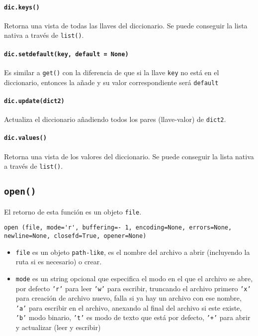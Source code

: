 \paragraph{\texttt{dic.keys()}} Retorna una vista de todas las llaves del
diccionario. Se puede conseguir la lista nativa a través de \texttt{list()}.

\paragraph{\texttt{dic.setdefault(key, default = None)}} Es similar a
\texttt{get()} con la diferencia de que si la llave \texttt{key} no está en el
diccionario, entonces la añade y su valor correspondiente será \texttt{default}

\paragraph{\texttt{dic.update(dict2)}} Actualiza el diccionario añadiendo todos
los pares (llave-valor) de \texttt{dict2}.

\paragraph{\texttt{dic.values()}} Retorna una vista de los valores del
diccionario. Se puede conseguir la lista nativa a través de \texttt{list()}.

\subsection{\texttt{open()}}

El retorno de esta función es un objeto \texttt{file}.

\begin{verbatim}
open (file, mode='r', buffering=- 1, encoding=None, errors=None, newline=None, closefd=True, opener=None)
\end{verbatim}

\begin{itemize}
    \item \texttt{file} es un objeto \texttt{path-like}, es el nombre del
          archivo a abrir (incluyendo la ruta si es necesario) o crear.
    \item \texttt{mode} es un string opcional que especifica el modo en el que
          el archivo se abre, por defecto \texttt{'r'} para leer \texttt{'w'} para
          escribir, truncando el archivo primero \texttt{'x'} para creación de archivo
          nuevo, falla si ya hay un archivo con ese nombre, \texttt{'a'} para escribir en
          el archivo, anexando al final del archivo si este existe, \texttt{'b'} modo
          binario, \texttt{'t'} es modo de texto que está por defecto, \texttt{'+'} para
          abrir y actualizar (leer y escribir)
\end{itemize}

